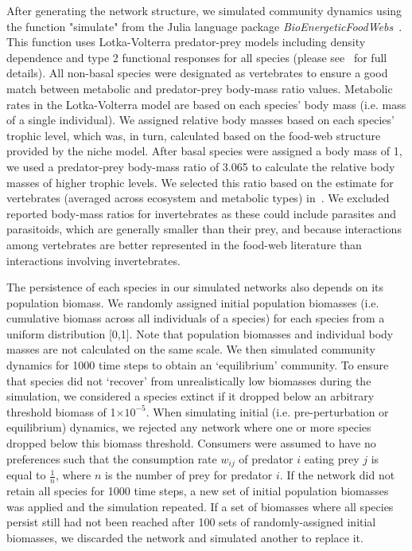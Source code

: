 \documentclass[12pt]{article}
\begin{document}
\begin{spacing}{2.0}
	After generating the network structure, we simulated community dynamics using the function "simulate" from the Julia language package \emph{BioEnergeticFoodWebs}~\citep{bioenergeticfw,Delmas2017}. This function uses Lotka-Volterra predator-prey models including density dependence and type 2 functional responses for all species (please see~\citet{Delmas2017} for full details).
	All non-basal species were designated as vertebrates to ensure a good match between metabolic and predator-prey body-mass ratio values. Metabolic rates in the Lotka-Volterra model are based on each species' body mass (i.e. mass of a single individual). We assigned relative body masses based on each species' trophic level, which was, in turn, calculated based on the food-web structure provided by the niche model. After basal species were assigned a body mass of 1, we used a predator-prey body-mass ratio of 3.065 to calculate the relative body masses of higher trophic levels. We selected this ratio based on the estimate for vertebrates (averaged across ecosystem and metabolic types) in~\citet{Brose2006}. We excluded reported body-mass ratios for invertebrates as these could include parasites and parasitoids, which are generally smaller than their prey, and because interactions among vertebrates are better represented in the food-web literature than interactions involving invertebrates.
	
	
	The persistence of each species in our simulated networks also depends on its population biomass. 
	We randomly assigned initial population biomasses (i.e. cumulative biomass across all individuals of a species) for each species from a uniform distribution [0,1]. Note that population biomasses and individual body masses are not calculated on the same scale. We then simulated community dynamics for 1000 time steps to obtain an `equilibrium' community. To ensure that species did not `recover' from unrealistically low biomasses during the simulation, we considered a species extinct if it dropped below an arbitrary threshold biomass of 1$\times10^{-5}$. When simulating initial (i.e. pre-perturbation or equilibrium) dynamics, we rejected any network where one or more species dropped below this biomass threshold. Consumers were assumed to have no preferences such that the consumption rate $w_{ij}$ of predator $i$ eating prey $j$ is equal to $\frac{1}{n}$, where $n$ is the number of prey for predator $i$. If the network did not retain all species for 1000 time steps, a new set of initial population biomasses was applied and the simulation repeated.
	If a set of biomasses where all species persist still had not been reached after 100 sets of randomly-assigned initial biomasses, we discarded the network and simulated another to replace it.



\end{spacing}
\end{document}
